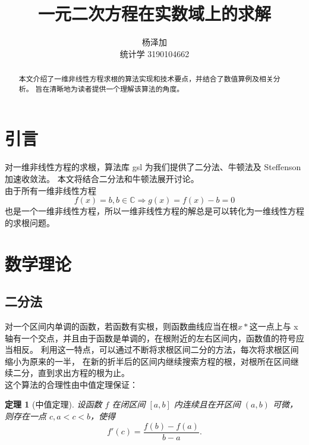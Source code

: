 \documentclass{ctexart}
\title{一元二次方程在实数域上的求解}
\author{杨泽加 \\ 统计学 3190104662}
\begin{document}
    
    \maketitle

    \begin{abstract}
        本文介绍了一维非线性方程求根的算法实现和技术要点，并结合了数值算例及相关分析。
        旨在清晰地为读者提供一个理解该算法的角度。
    \end{abstract}


    \section{引言}\label{S1}
    对一维非线性方程的求根，算法库 gsl \cite{GSLhandwriting}为我们提供了二分法、牛顿法及 Steffenson 加速收敛法。
    本文将结合二分法和牛顿法展开讨论。 \\
    由于所有一维非线性方程    \\
    \begin{equation}
        \label{E1}
        f(x) = b, b \in \mathbb{C} \Rightarrow g(x) = f(x) - b = 0
    \end{equation}
    也是一个一维非线性方程，所以一维非线性方程的解总是可以转化为一维线性方程的求根问题。


    \section{数学理论}\label{S2}

    \subsection{二分法}\label{S2.1}
    对一个区间内单调的函数，若函数有实根，则函数曲线应当在根$x*$这一点上与
    x轴有一个交点，并且由于函数是单调的，在根附近的左右区间内，函数值的符号应当相反。
    利用这一特点，可以通过不断将求根区间二分的方法，每次将求根区间缩小为原来的一半，
    在新的折半后的区间内继续搜索方程的根，对根所在区间继续二分，直到求出方程的根为止。 \\
    这个算法的合理性由中值定理保证：\\
    \newtheorem{theorem}{定理}
    \begin{theorem}[中值定理]
        \label{T1}
        设函数 $f$ 在闭区间 $[a,b]$ 内连续且在开区间 $(a,b)$ 可微，则存在一点
        $c, a < c < b$，使得
        \begin{equation}
            \label{E2}
            f'(c) = \frac{f(b) - f(a)}{b - a}.
        \end{equation}
    \end{theorem}
\end{document}
